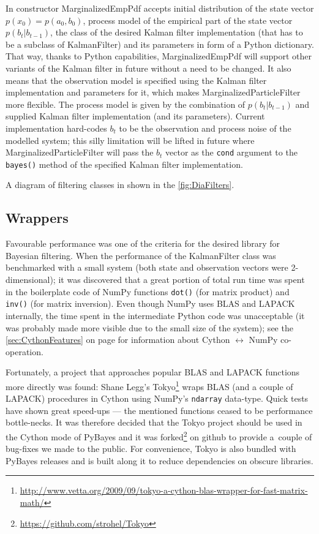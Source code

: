 In constructor MarginalizedEmpPdf accepts initial distribution of the state vector
\(p(x_0) = p(a_0, b_0)\), process model of the empirical part of the state vector \(p(b_t|b_{t-1})\),
the class of the desired Kalman filter implementation (that has to be a subclass of KalmanFilter)
and its parameters in form of a Python dictionary. That way, thanks to Python capabilities,
MarginalizedEmpPdf will support other variants of the Kalman filter in future without a need to be
changed. It also means that the observation model is specified using the Kalman filter implementation
and parameters for it, which makes MarginalizedParticleFilter more flexible. The process model is
given by the combination of \(p(b_t|b_{t-1})\) and supplied Kalman filter implementation (and its
parameters). Current implementation hard-codes \(b_t\) to be the observation and process noise of
the modelled system; this silly limitation will be lifted in future where MarginalizedParticleFilter
will pass the \(b_t\) vector as the \verb|cond| argument to the \verb|bayes()| method of the
specified Kalman filter implementation.

A diagram of filtering classes in shown in the \autoref{fig:DiaFilters}.

\subsection{Wrappers} \label{sec:PyBayesWrappers}

Favourable performance was one of the criteria for the desired library for Bayesian filtering. When
the performance of the KalmanFilter class was benchmarked with a small system (both state and
observation vectors were 2-dimensional); it was discovered that a great portion of total run time
was spent in the boilerplate code of NumPy functions \verb|dot()| (for matrix product) and
\verb|inv()| (for matrix inversion). Even though NumPy uses BLAS and LAPACK internally, the time
spent in the intermediate Python code was unacceptable (it was probably made more visible due to
the small size of the system); see the \autoref{sec:CythonFeatures} on page
\pageref{sec:CythonFeatures} for information about Cython \(\leftrightarrow \) NumPy co-operation.

Fortunately, a project that approaches popular BLAS and LAPACK functions more directly was found:
Shane Legg's Tokyo\footnote{\url{http://www.vetta.org/2009/09/tokyo-a-cython-blas-wrapper-for-fast-matrix-math/}}
wraps BLAS (and a couple of LAPACK) procedures in Cython using NumPy's \verb|ndarray| data-type.
Quick tests have shown great speed-ups --- the mentioned functions ceased to be performance
bottle-necks. It was therefore decided that the Tokyo project should be used in the Cython mode of
PyBayes and it was forked\footnote{\url{https://github.com/strohel/Tokyo}} on github to provide
a~couple of bug-fixes we made to the public. For convenience, Tokyo is also bundled with PyBayes
releases and is built along it to reduce dependencies on obscure libraries.

